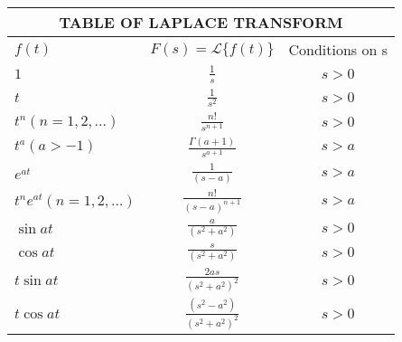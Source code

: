 \documentclass[12pt]{report}
\begin{document}
\begin{center}
	\renewcommand{\arraystretch}{1.6}
	\renewcommand{\tabcolsep}{8mm}
	\begin{tabular}{llcccc}
		\multicolumn{6}{c}{TABLE OF LAPLACE TRANSFORM} \\
		\hline 
		\multicolumn{2}{l}{$f(t)$} &  \multicolumn{2}{c}{$F(s) = \mathcal{L}\{f(t)\}$} & \multicolumn{2}{c}{Conditions on s} \\ 
		\hline
		
 		\multicolumn{2}{l}{$\displaystyle1$} & \multicolumn{2}{c}{$\displaystyle \frac{1}{s}$} & \multicolumn{2}{c}{$s > 0$} \\
		
		\multicolumn{2}{l}{$\displaystyle t$} & \multicolumn{2}{c}{$\displaystyle \frac{1}{s^2}$} & \multicolumn{2}{c}{$s > 0$} \\

		\multicolumn{2}{l}{$\displaystyle t^n (n=1,2,\ldots)$} & \multicolumn{2}{c}{$\displaystyle \frac{n!}{s^{n+1}}$} & \multicolumn{2}{c}{$s > 0$} \\


		\multicolumn{2}{l}{$\displaystyle t^a (a > -1)$} & \multicolumn{2}{c}{$\displaystyle \frac{\Gamma(a+1)}{s^{a+1}}$} & \multicolumn{2}{c}{$s > a$} \\



		\multicolumn{2}{l}{$\displaystyle e^{at}$} & \multicolumn{2}{c}{$\displaystyle \frac{1}{(s-a)}$} & \multicolumn{2}{c}{$s > a$} \\

		\multicolumn{2}{l}{$\displaystyle t^n e^{at} (n= 1, 2,\ldots)$} & \multicolumn{2}{c}{$\displaystyle \frac{n!}{(s-a)^{n+1}}$} & \multicolumn{2}{c}{$s > a$} \\


		\multicolumn{2}{l}{$\displaystyle \sin at$} & \multicolumn{2}{c}{$\displaystyle \frac{a}{(s^2 + a^2)}$} & \multicolumn{2}{c}{$s > 0$} \\

		\multicolumn{2}{l}{$\displaystyle \cos at$} & \multicolumn{2}{c}{$\displaystyle \frac{s}{(s^2 + a^2)}$} & \multicolumn{2}{c}{$s > 0$} \\


		\multicolumn{2}{l}{$\displaystyle t \sin at$} & \multicolumn{2}{c}{$\displaystyle \frac{2as}{(s^2 + a^2)^2}$} & \multicolumn{2}{c}{$s > 0$} \\

		\multicolumn{2}{l}{$\displaystyle t \cos at$} & \multicolumn{2}{c}{$\displaystyle \frac{(s^2 - a^2)}{(s^2 + a^2)^2}$} & \multicolumn{2}{c}{$s > 0$} \\



\end{tabular}
\end{center}
\end{document}
